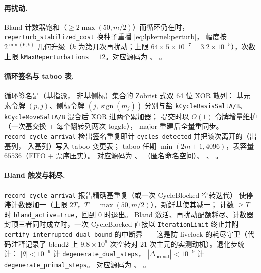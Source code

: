 \paragraph{再扰动.}
Bland 计数器饱和（$\ge 2\max(50, m/2)$）而循环仍在时，
\texttt{reperturb\_stabilized\_cost} 换种子重播 \eqref{eq:lpkernel:perturb}，
幅度按 $2^{\min(6, k)}$ 几何升级（$k$ 为第几次再扰动；上限
$64 \times 5\times10^{-7} = 3.2\times10^{-5}$），次数上限
\texttt{kMaxReperturbations}${}=12$。对应源码为
、
。

\paragraph{循环签名与 taboo 表.}
循环签名是（基指派， 非基侧标）集合的 Zobrist 式双 64 位 XOR 散列：
基元素令牌 $(p, j)$、侧标令牌 $(j, \operatorname{sign}(m_j))$ 分别与盐
\texttt{kCycleBasisSaltA/B}、\texttt{kCycleMoveSaltA/B} 混合后 XOR 进两个累加器；
提交时以 $O(1)$ 令牌增量维护（一次基交换 + 每个翻转列两次 toggle），
major 重建后全量重同步。\texttt{record\_cycle\_arrival} 检出签名重复即计
\texttt{cycles\_detected} 并把该次离开的（出基列， 入基列）写入 taboo 变更表；
taboo 任期 $\min(2m+1, 4096)$，表容量 $65536$（FIFO + 票序压实）。
对应源码为 、
（匿名命名空间）、
、
。

\paragraph{Bland 触发与耗尽.}
\texttt{record\_cycle\_arrival} 报告精确基重复（或一次 CycleBlocked 空转迭代）
使停滞计数器加一（上限 $2T$，$T = \max(50, m/2)$），新鲜基使其减一；
计数 $\ge T$ 时 \texttt{bland\_active=true}，回到 $0$ 时退出。
Bland 激活、再扰动配额耗尽、计数器封顶三者同时成立时，一次 CycleBlocked
直接以 \texttt{IterationLimit} 终止并附 \texttt{certify\_interrupted\_dual\_bound}
的中断界——这是防 livelock 的耗尽守卫（代码注释记录了 blend2 上
$9.8\times10^{6}$ 次空转对 21 次主元的实测动机）。退化步统计：
$|\theta| < 10^{-9}$ 计 \texttt{degenerate\_dual\_steps}，
$|\Delta_{\text{primal}}| < 10^{-9}$ 计 \texttt{degenerate\_primal\_steps}。
对应源码为 、
。

